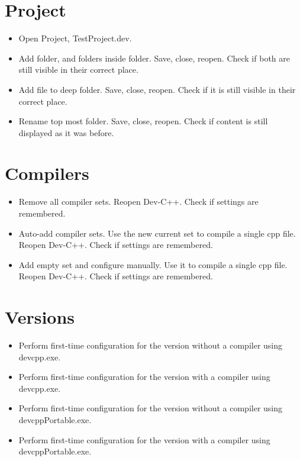 \documentclass{article}
\begin{document}
\clearpage
\section{Project}
\begin{itemize}
    \item Open Project, TestProject.dev.
    \item Add folder, and folders inside folder. Save, close, reopen. Check if both are still visible in their correct place.
    \item Add file to deep folder.  Save, close, reopen. Check if it is still visible in their correct place.
    \item Rename top most folder. Save, close, reopen. Check if content is still displayed as it was before.
\end{itemize}

\clearpage
\section{Compilers}
\begin{itemize}
    \item Remove all compiler sets. Reopen Dev-C++. Check if settings are remembered.
    \item Auto-add compiler sets. Use the new current set to compile a single cpp file. Reopen Dev-C++. Check if settings are remembered.
    \item Add empty set and configure manually. Use it to compile a single cpp file. Reopen Dev-C++. Check if settings are remembered.
\end{itemize}

\clearpage
\section{Versions}
\begin{itemize}
    \item Perform first-time configuration for the version without a compiler using devcpp.exe.
    \item Perform first-time configuration for the version with a compiler using devcpp.exe.
    \item Perform first-time configuration for the version without a compiler using devcppPortable.exe.
    \item Perform first-time configuration for the version with a compiler using devcppPortable.exe.
\end{itemize}
\end{document}
